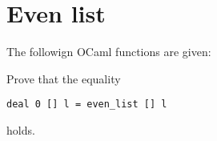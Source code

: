 \section{Even list}
The followign OCaml functions are given:

Prove that the equality
\begin{center}
    \begin{lstlisting}
deal 0 [] l = even_list [] l\end{lstlisting}
\end{center}
holds.